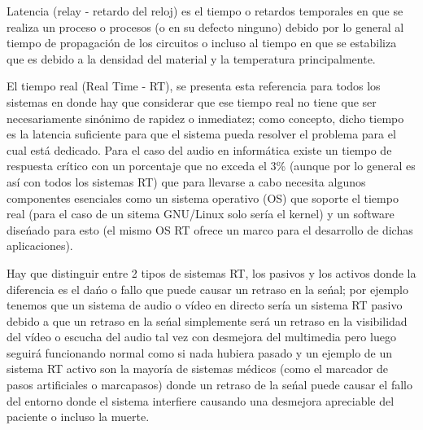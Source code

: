 \begin{multicols}{2}
Latencia (relay - retardo del reloj) es el tiempo o retardos temporales en que se realiza un proceso o procesos (o en su defecto ninguno) debido por lo general al tiempo de propagación de los circuitos o incluso al tiempo en que se estabiliza que es debido a la densidad del material y la temperatura principalmente.

\begin{center}
\end{center}

\begin{center}
\end{center}

El tiempo real (Real Time - RT), se presenta esta referencia para todos los sistemas en donde hay que considerar que ese tiempo real no tiene que ser necesariamente sinónimo de rapidez o inmediatez; como concepto, dicho tiempo es la latencia suficiente para que el sistema pueda resolver el problema para el cual está dedicado. Para el caso del audio en informática existe un tiempo de respuesta crítico con un porcentaje que no exceda el 3\% (aunque por lo general es así con todos los sistemas RT) que para llevarse a cabo necesita algunos componentes esenciales como un sistema operativo (OS) que soporte el tiempo real (para el caso de un sitema GNU/Linux solo sería el kernel) y un software diseńado para esto (el mismo OS RT ofrece un marco para el desarrollo de dichas aplicaciones).

Hay que distinguir entre 2 tipos de sistemas RT, los pasivos y los activos donde la diferencia es el dańo o fallo que puede causar un retraso en la seńal; por ejemplo tenemos que un sistema de audio o vídeo en directo sería un sistema RT pasivo debido a que un retraso en la seńal simplemente será un retraso en la visibilidad del vídeo o escucha del audio tal vez con desmejora del multimedia pero luego seguirá funcionando normal como si nada hubiera pasado y un ejemplo de un sistema RT activo son la mayoría de sistemas médicos (como el marcador de pasos artificiales o marcapasos) donde un retraso de la seńal puede causar el fallo del entorno donde el sistema interfiere causando una desmejora apreciable del paciente o incluso la muerte.


\end{multicols}
